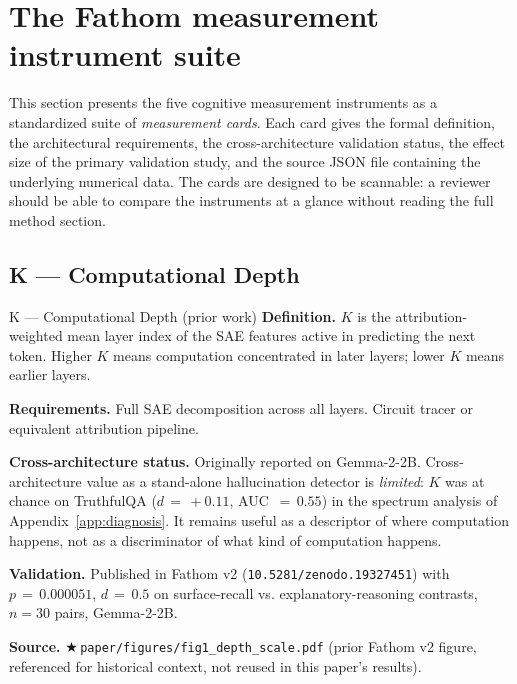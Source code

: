 \documentclass[11pt,letterpaper]{article}
\newcommand{\repro}[1]{%
  \textcolor{fathomgreen}{\footnotesize$\bigstar$\,\texttt{#1}}}
\begin{document}
\section{The Fathom measurement instrument suite}
\label{sec:instruments}

This section presents the five cognitive measurement instruments as a
standardized suite of \emph{measurement cards}. Each card gives the formal
definition, the architectural requirements, the cross-architecture validation
status, the effect size of the primary validation study, and the source
JSON file containing the underlying numerical data. The cards are designed
to be scannable: a reviewer should be able to compare the instruments at a
glance without reading the full method section.

\subsection{K --- Computational Depth}

\begin{mcard}{K --- Computational Depth (prior work)}
\textbf{Definition.} $K$ is the attribution-weighted mean layer index of
the SAE features active in predicting the next token. Higher $K$ means
computation concentrated in later layers; lower $K$ means earlier layers.
\vspace{2pt}

\textbf{Requirements.} Full SAE decomposition across all layers. Circuit
tracer or equivalent attribution pipeline.
\vspace{2pt}

\textbf{Cross-architecture status.} Originally reported on Gemma-2-2B.
Cross-architecture value as a stand-alone hallucination detector is
\emph{limited}: $K$ was at chance on TruthfulQA ($d\,=\,+0.11$,
AUC $\,=\,0.55$) in the spectrum analysis of Appendix~\ref{app:diagnosis}. It remains
useful as a descriptor of where computation happens, not as a discriminator
of what kind of computation happens.
\vspace{2pt}

\textbf{Validation.} Published in Fathom v2 (\texttt{10.5281/zenodo.19327451})
with $p\,=\,0.000051$, $d\,=\,0.5$ on surface-recall vs. explanatory-reasoning
contrasts, $n\!=\!30$ pairs, Gemma-2-2B.
\vspace{2pt}

\textbf{Source.} \repro{paper/figures/fig1\_depth\_scale.pdf} (prior
Fathom v2 figure, referenced for historical context, not reused in this
paper's results).
\end{mcard}
\end{document}
